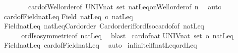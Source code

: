 \begin{isabellebody}
\ \ \ \ \ \ \ \ card{\isacharunderscore}{\kern0pt}of{\isacharunderscore}{\kern0pt}Well{\isacharunderscore}{\kern0pt}order{\isacharbrackleft}{\kern0pt}of\ {\isachardoublequoteopen}UNIV{\isacharcolon}{\kern0pt}{\isacharcolon}{\kern0pt}nat\ set{\isachardoublequoteclose}{\isacharbrackright}{\kern0pt}\ natLeq{\isacharunderscore}{\kern0pt}on{\isacharunderscore}{\kern0pt}Well{\isacharunderscore}{\kern0pt}order{\isacharbrackleft}{\kern0pt}of\ n{\isacharbrackright}{\kern0pt}\ \isamarkupfalse%
\ auto\isanewline
{}\isamarkupfalse%
%
\endisatagproof
{\isafoldproof}%
%
\isadelimproof
\isanewline
%
\endisadelimproof
\isanewline
{}\isamarkupfalse%
\ card{\isacharunderscore}{\kern0pt}of{\isacharunderscore}{\kern0pt}Field{\isacharunderscore}{\kern0pt}natLeq{\isacharcolon}{\kern0pt}\isanewline
{\isachardoublequoteopen}{\isacharbar}{\kern0pt}Field\ natLeq{\isacharbar}{\kern0pt}\ {\isacharequal}{\kern0pt}o\ natLeq{\isachardoublequoteclose}\isanewline
%
\isadelimproof
%
\endisadelimproof
%
\isatagproof
{}\isamarkupfalse%
\ Field{\isacharunderscore}{\kern0pt}natLeq\ natLeq{\isacharunderscore}{\kern0pt}Card{\isacharunderscore}{\kern0pt}order\ Card{\isacharunderscore}{\kern0pt}order{\isacharunderscore}{\kern0pt}iff{\isacharunderscore}{\kern0pt}ordIso{\isacharunderscore}{\kern0pt}card{\isacharunderscore}{\kern0pt}of{\isacharbrackleft}{\kern0pt}of\ natLeq{\isacharbrackright}{\kern0pt}\isanewline
\ \ \ \ \ \ ordIso{\isacharunderscore}{\kern0pt}symmetric{\isacharbrackleft}{\kern0pt}of\ natLeq{\isacharbrackright}{\kern0pt}\ \isamarkupfalse%
\ blast%
\endisatagproof
{\isafoldproof}%
%
\isadelimproof
\isanewline
%
\endisadelimproof
\isanewline
{}\isamarkupfalse%
\ card{\isacharunderscore}{\kern0pt}of{\isacharunderscore}{\kern0pt}nat{\isacharcolon}{\kern0pt}\isanewline
{\isachardoublequoteopen}{\isacharbar}{\kern0pt}UNIV{\isacharcolon}{\kern0pt}{\isacharcolon}{\kern0pt}nat\ set{\isacharbar}{\kern0pt}\ {\isacharequal}{\kern0pt}o\ natLeq{\isachardoublequoteclose}\isanewline
%
\isadelimproof
%
\endisadelimproof
%
\isatagproof
{}\isamarkupfalse%
\ Field{\isacharunderscore}{\kern0pt}natLeq\ card{\isacharunderscore}{\kern0pt}of{\isacharunderscore}{\kern0pt}Field{\isacharunderscore}{\kern0pt}natLeq\ \isamarkupfalse%
\ auto%
\endisatagproof
{\isafoldproof}%
%
\isadelimproof
\isanewline
%
\endisadelimproof
\isanewline
{}\isamarkupfalse%
\ infinite{\isacharunderscore}{\kern0pt}iff{\isacharunderscore}{\kern0pt}natLeq{\isacharunderscore}{\kern0pt}ordLeq{\isacharcolon}{\kern0pt}\isanewline

\end{isabellebody}
